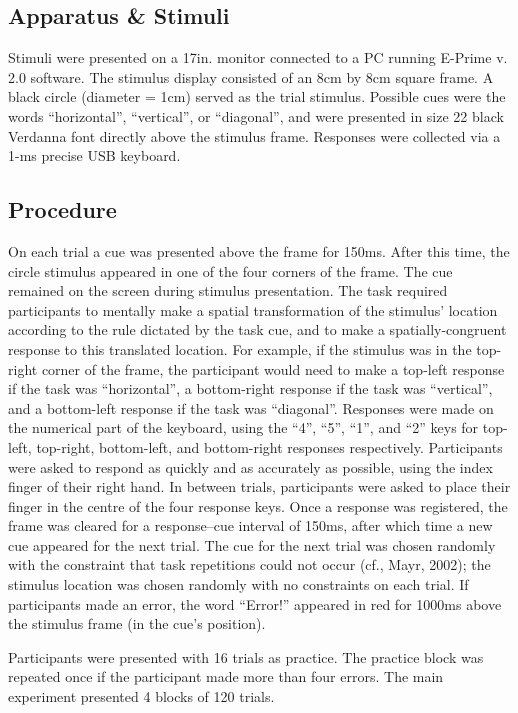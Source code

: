 \documentclass[a4paper, doc, natbib]{apa6}
\begin{document}
\subsection{Apparatus \& Stimuli}
Stimuli were presented on a 17in. monitor connected to a PC running E-Prime v. 2.0 software. The stimulus display consisted of an 8cm by 8cm square frame. A black circle (diameter = 1cm) served as the trial stimulus. Possible cues were the words ``horizontal'', ``vertical'', or ``diagonal'', and were presented in size 22 black Verdanna font directly above the stimulus frame. Responses were collected via a 1-ms precise USB keyboard.

\subsection{Procedure}
On each trial a cue was presented above the frame for 150ms. After this time, the circle stimulus appeared in one of the four corners of the frame. The cue remained on the screen during stimulus presentation. The task required participants to mentally make a spatial transformation of the stimulus' location according to the rule dictated by the task cue, and to make a spatially-congruent response to this translated location. For example, if the stimulus was in the top-right corner of the frame, the participant would need to make a top-left response if the task was ``horizontal'', a bottom-right response if the task was ``vertical'', and a bottom-left response if the task was ``diagonal''. Responses were made on the numerical part of the keyboard, using the ``4'', ``5'', ``1'', and ``2'' keys for top-left, top-right, bottom-left, and bottom-right responses respectively. Participants were asked to respond as quickly and as accurately as possible, using the index finger of their right hand. In between trials, participants were asked to place their finger in the centre of the four response keys. Once a response was registered, the frame was cleared for a response--cue interval of 150ms, after which time a new cue appeared for the next trial. The cue for the next trial was chosen randomly with the constraint that task repetitions could not occur (cf., Mayr, 2002); the stimulus location was chosen randomly with no constraints on each trial. If participants made an error, the word ``Error!'' appeared in red for 1000ms above the stimulus frame (in the cue's position).

Participants were presented with 16 trials as practice. The practice block was repeated once if the participant made more than four errors. The main experiment presented 4 blocks of 120 trials. 
\end{document}
